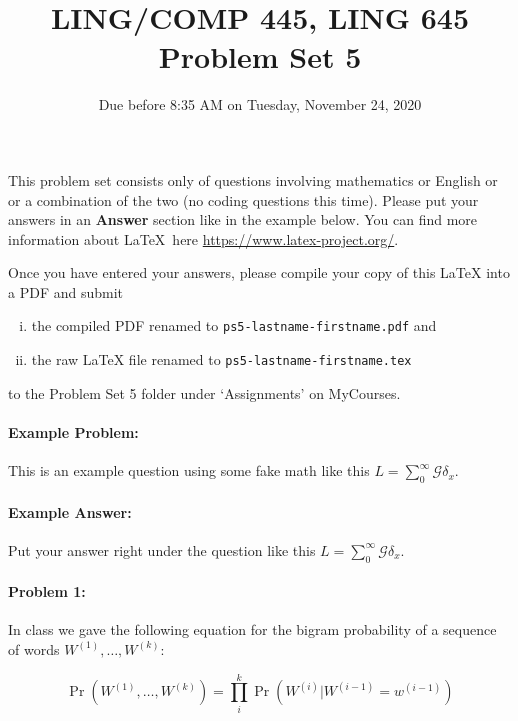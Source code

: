 \documentclass[10pt]{article}
\newcommand{\PSnum}{5}
\begin{document}
\title{LING/COMP 445, LING 645\\Problem Set \PSnum}
\date{Due before 8:35 AM on Tuesday, November 24, 2020}
\maketitle

This problem set consists only of questions involving mathematics or
English or or a combination of the two (no coding questions this time).
Please put your answers in an
\textbf{Answer} section like in the example below. You can find more
information about \LaTeX\ here \url{https://www.latex-project.org/}.

Once you have entered your answers, please compile your copy of this
\LaTeX{} into a PDF and submit 
\begin{enumerate}[(i),noitemsep]
\item
the compiled PDF renamed to
\texttt{ps\PSnum-lastname-firstname.pdf} and
\item
the raw \LaTeX{} file renamed to
\texttt{ps\PSnum-lastname-firstname.tex}
\end{enumerate}
to the Problem Set \PSnum{} folder under `Assignments' on MyCourses.


\noindent\hrulefill %

\paragraph{Example Problem:}
This is an example question using some fake math like this
$L=\sum_0^{\infty} \mathcal{G} \delta_x$.

\paragraph{Example Answer:} Put your answer right under the question like
this $L=\sum_0^{\infty} \mathcal{G} \delta_x$.

\noindent\hrulefill %

\paragraph{Problem 1:}
 
In class we gave the following equation for the bigram probability of
a sequence of words $W^{(1)},\dots,W^{(k)}$:

\begin{equation}\label{eq:bigram}
\Pr(W^{(1)},\dots,W^{(k)})=\prod_i^k \Pr(W^{(i)} | W^{(i-1)}=w^{(i-1)})
\end{equation}
\end{document}
